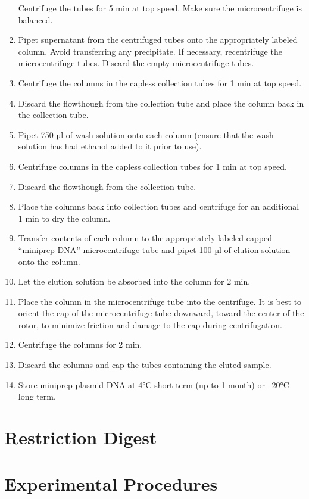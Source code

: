 \documentclass[]{book}
\theoremstyle{definition}
\theoremstyle{definition}
\theoremstyle{definition}
\theoremstyle{remark}
\begin{document}
\begin{enumerate}
  Centrifuge the tubes for 5 min at top speed. Make sure the
  microcentrifuge is balanced.
\item
  Pipet supernatant from the centrifuged tubes onto the appropriately
  labeled column. Avoid transferring any precipitate. If necessary,
  recentrifuge the microcentrifuge tubes. Discard the empty
  microcentrifuge tubes.
\item
  Centrifuge the columns in the capless collection tubes for 1 min at
  top speed.
\item
  Discard the flowthough from the collection tube and place the column
  back in the collection tube.
\item
  Pipet 750 µl of wash solution onto each column (ensure that the wash
  solution has had ethanol added to it prior to use).
\item
  Centrifuge columns in the capless collection tubes for 1 min at top
  speed.
\item
  Discard the flowthough from the collection tube.
\item
  Place the columns back into collection tubes and centrifuge for an
  additional 1 min to dry the column.
\item
  Transfer contents of each column to the appropriately labeled capped
  ``miniprep DNA'' microcentrifuge tube and pipet 100 µl of elution
  solution onto the column.
\item
  Let the elution solution be absorbed into the column for 2 min.
\item
  Place the column in the microcentrifuge tube into the centrifuge. It
  is best to orient the cap of the microcentrifuge tube downward, toward
  the center of the rotor, to minimize friction and damage to the cap
  during centrifugation.
\item
  Centrifuge the columns for 2 min.
\item
  Discard the columns and cap the tubes containing the eluted sample.
\item
  Store miniprep plasmid DNA at 4°C short term (up to 1 month) or --20°C
  long term.
\end{enumerate}

\section{Restriction Digest}\label{restriction-digest}

\section{Experimental Procedures}\label{experimental-procedures-16}
\end{document}
